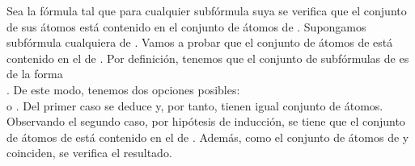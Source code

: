 \begin{isabellebody}
\begin{isamarkuptext}
\begin{demostracion}
  Sea la fórmula  tal que para cualquier subfórmula suya se verifica 
  que el conjunto de sus átomos está contenido en el conjunto de átomos 
  de . Supongamos  subfórmula cualquiera de . Vamos a
  probar que el conjunto de átomos de  está contenido en el de 
  .
  Por definición, tenemos que el conjunto de subfórmulas de  es de
  la forma \\ . De este modo, tenemos dos 
  opciones posibles:\\  o . 
  Del primer caso se deduce  
  y, por tanto, tienen igual conjunto de átomos.
  Observando el segundo caso, por hipótesis de inducción, se tiene que 
  el conjunto de átomos de  está contenido en el de . Además, como 
  el conjunto de átomos de  y  coinciden, se verifica el 
  resultado.


\end{demostracion}
\end{isamarkuptext}
\end{isabellebody}
